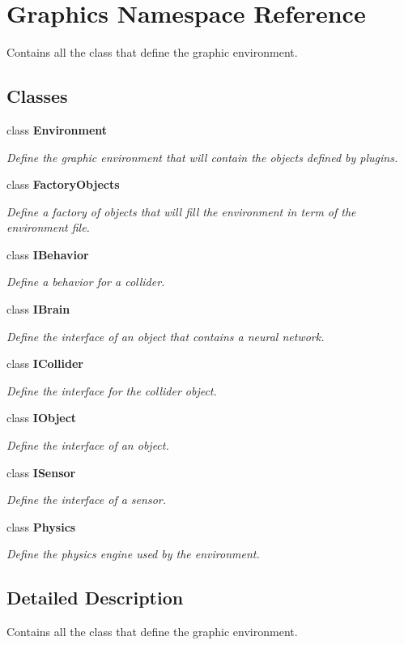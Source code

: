 \section{Graphics Namespace Reference}
\label{namespace_graphics}


Contains all the class that define the graphic environment.  


\subsection*{Classes}
\begin{DoxyCompactItemize}
\item 
class {\bf Environment}
\begin{DoxyCompactList}\small\item\em Define the graphic environment that will contain the objects defined by plugins. \end{DoxyCompactList}\item 
class {\bf Factory\+Objects}
\begin{DoxyCompactList}\small\item\em Define a factory of objects that will fill the environment in term of the environment file. \end{DoxyCompactList}\item 
class {\bf I\+Behavior}
\begin{DoxyCompactList}\small\item\em Define a behavior for a collider. \end{DoxyCompactList}\item 
class {\bf I\+Brain}
\begin{DoxyCompactList}\small\item\em Define the interface of an object that contains a neural network. \end{DoxyCompactList}\item 
class {\bf I\+Collider}
\begin{DoxyCompactList}\small\item\em Define the interface for the collider object. \end{DoxyCompactList}\item 
class {\bf I\+Object}
\begin{DoxyCompactList}\small\item\em Define the interface of an object. \end{DoxyCompactList}\item 
class {\bf I\+Sensor}
\begin{DoxyCompactList}\small\item\em Define the interface of a sensor. \end{DoxyCompactList}\item 
class {\bf Physics}
\begin{DoxyCompactList}\small\item\em Define the physics engine used by the environment. \end{DoxyCompactList}\end{DoxyCompactItemize}


\subsection{Detailed Description}
Contains all the class that define the graphic environment. 